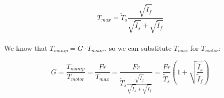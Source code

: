 \documentclass[a4paper]{article}
\begin{document}
	\begin{equation}
		T_{max} = \widetilde{T}_s \frac{\sqrt{\widetilde{I}_f}}{\sqrt{\widetilde{I}_s} + \sqrt{\widetilde{I}_f}}
	\end{equation}
	\\
	We know that $ T_{manip} = G \cdot T_{motor} $, so we can substitute $ T_{max} $ for $ T_{motor} $:
	
	\begin{equation}
		G = \frac{T_{manip}}{T_{motor}} = \frac{F r}{T_{max}}
		= \frac{F r}{\widetilde{T}_s \frac{\sqrt{\widetilde{I}_f}}{\sqrt{\widetilde{I}_s} + \sqrt{\widetilde{I}_f}}}
		= \frac{F r}{\widetilde{T}_s} \left( 1 + \sqrt{\frac{\widetilde{I}_s}{\widetilde{I}_f}} \right)
	\end{equation}
	
	
	
	
	
\end{document}
